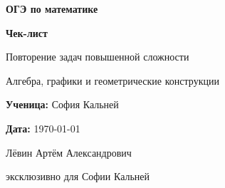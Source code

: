 \documentclass[a4paper,12pt]{article}
\begin{document}

\begin{titlepage}
\thispagestyle{empty}
\centering

\vspace*{22mm}

{\Large\textcolor{darkaccent}{\textbf{ОГЭ по математике}}\par}

\vspace{12mm}

{\Huge\textbf{Чек-лист}\par}

\vspace{5mm}

{\LARGE\textcolor{accent}{
Повторение задач повышенной сложности
}\par}

\vspace{4mm}

{\large
Алгебра, графики и геометрические конструкции
\par}

\vspace{18mm}

{\large\textbf{Ученица:} София Кальней\par}

\vspace{4mm}

{\large\textbf{Дата:} \today\par}

\vfill

{\large Лёвин Артём Александрович\par}
{\normalsize эксклюзивно для Софии Кальней\par}

\vspace{13mm}


\vspace{5mm}

\end{titlepage}

\end{document}
